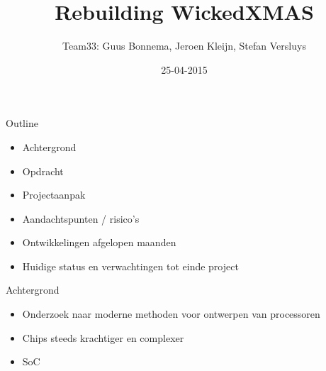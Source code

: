 \documentclass[10pt]{beamer}
\title[Plan]{Rebuilding WickedXMAS}
\author[Team33]{Team33: Guus Bonnema, Jeroen Kleijn, Stefan Versluys}
\date{25-04-2015}
\institute[OU nl]{Open University The Netherlands}
\begin{document}
\newcommand{\xmas}{x\textsc{mas}}%
\newcommand{\ok}{$\checkmark$}


\frame{\maketitle}   %



\begin{frame}[label=outline]{Outline}

    \begin{itemize}
        \item Achtergrond
        \item Opdracht
        \item Projectaanpak
        \item Aandachtspunten / risico's
        \item Ontwikkelingen afgelopen maanden
        \item Huidige status en verwachtingen tot einde project
    \end{itemize}

\end{frame}

\begin{frame}[label=achtergrond]{Achtergrond}
 \begin{itemize}
  \item <1->Onderzoek naar moderne methoden voor ontwerpen van processoren
  \item <1->Chips steeds krachtiger en complexer
  \item <2->SoC
 \end{itemize}


\end{frame}
\end{document}

